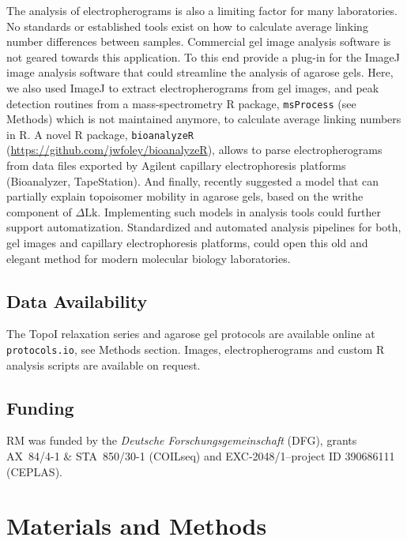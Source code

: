 \documentclass[10pt,a4]{article}
\newcommand{\dlk}{\ensuremath{\Delta\text{Lk}}}
\begin{document}
The analysis of electropherograms is also a limiting factor for many
laboratories. No standards or established tools exist on how to
calculate average linking number differences between
samples. Commercial gel image analysis software is not geared towards
this application. To this end \citet{Ziraldo2019} provide a plug-in
for the ImageJ image analysis software that could streamline the
analysis of agarose gels. Here, we also used ImageJ to extract
electropherograms from gel images, and peak detection routines from a
mass-spectrometry R package, \texttt{msProcess} (see Methods) which is
not maintained anymore, to calculate average linking numbers in R. A
novel R package, \texttt{bioanalyzeR}
(\url{https://github.com/jwfoley/bioanalyzeR}), allows to parse
electropherograms from data files exported by Agilent capillary
electrophoresis platforms (Bioanalyzer, TapeStation).
%
And finally, \citet{Vetcher2010} recently suggested a model that can
partially explain topoisomer mobility in agarose gels,
based on the writhe component of \dlk{}. Implementing such models in
analysis tools could further support automatization.  Standardized and
automated analysis pipelines for both, gel images and capillary
electrophoresis platforms, could open this old and elegant method for
modern molecular biology laboratories.



\subsection*{Data Availability}
The TopoI relaxation series and agarose gel protocols are available
online at \texttt{protocols.io}, see Methods section.  Images,
electropherograms and custom R analysis scripts are
available on request.

\subsection*{Funding}
RM was funded by the \textit{Deutsche Forschungsgemeinschaft} (DFG),
grants AX~84/4-1 \& STA~850/30-1 (COILseq) and EXC-2048/1--project ID
390686111 (CEPLAS).


\section{Materials and Methods}
\end{document}
